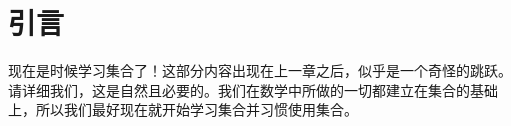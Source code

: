 \section{引言}

现在是时候学习集合了！这部分内容出现在上一章之后，似乎是一个奇怪的跳跃。请详细我们，这是自然且必要的。我们在数学中所做的一切都建立在集合的基础上，所以我们最好现在就开始学习集合并习惯使用集合。








